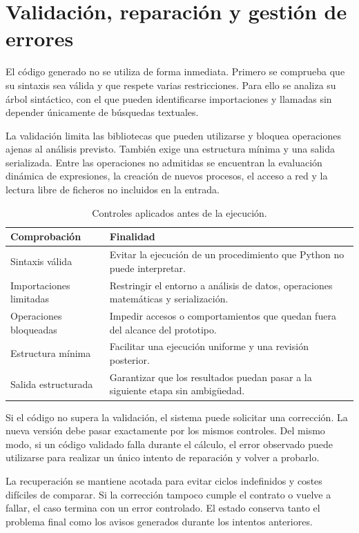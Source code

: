 \section{Validación, reparación y gestión de errores}

El código generado no se utiliza de forma inmediata. Primero se comprueba que su sintaxis sea válida y que respete varias restricciones. Para ello se analiza su árbol sintáctico, con el que pueden identificarse importaciones y llamadas sin depender únicamente de búsquedas textuales.

La validación limita las bibliotecas que pueden utilizarse y bloquea operaciones ajenas al análisis previsto. También exige una estructura mínima y una salida serializada. Entre las operaciones no admitidas se encuentran la evaluación dinámica de expresiones, la creación de nuevos procesos, el acceso a red y la lectura libre de ficheros no incluidos en la entrada.

\begin{table}[H]
\centering
\small
\begin{tabularx}{\textwidth}{L{0.28\textwidth}Y}
\toprule
\textbf{Comprobación} & \textbf{Finalidad} \\
\midrule
Sintaxis válida & Evitar la ejecución de un procedimiento que Python no puede interpretar. \\
Importaciones limitadas & Restringir el entorno a análisis de datos, operaciones matemáticas y serialización. \\
Operaciones bloqueadas & Impedir accesos o comportamientos que quedan fuera del alcance del prototipo. \\
Estructura mínima & Facilitar una ejecución uniforme y una revisión posterior. \\
Salida estructurada & Garantizar que los resultados puedan pasar a la siguiente etapa sin ambigüedad. \\
\bottomrule
\end{tabularx}
\caption{Controles aplicados antes de la ejecución.}
\label{tab:controles_implementacion}
\end{table}

Si el código no supera la validación, el sistema puede solicitar una corrección. La nueva versión debe pasar exactamente por los mismos controles. Del mismo modo, si un código validado falla durante el cálculo, el error observado puede utilizarse para realizar un único intento de reparación y volver a probarlo.

La recuperación se mantiene acotada para evitar ciclos indefinidos y costes difíciles de comparar. Si la corrección tampoco cumple el contrato o vuelve a fallar, el caso termina con un error controlado. El estado conserva tanto el problema final como los avisos generados durante los intentos anteriores.

